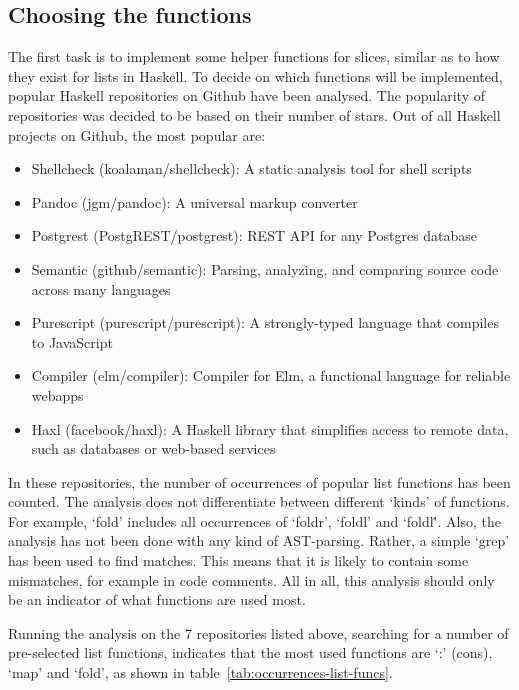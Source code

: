 \subsection{Choosing the functions}

The first task is to implement some helper functions for slices, similar as to how they exist
for lists in Haskell. To decide on which functions will be implemented, popular
Haskell repositories on Github have been analysed. The popularity of repositories
was decided to be based on their number of stars. Out of all Haskell projects
on Github, the most popular are\autocite{github-popular-haskell}:

\begin{itemize}
    \item Shellcheck (koalaman/shellcheck\autocite{github-shellcheck}): A static analysis tool for shell scripts
    \item Pandoc (jgm/pandoc\autocite{github-pandoc}): A universal markup converter
    \item Postgrest (PostgREST/postgrest\autocite{github-postgrest}): REST API for any Postgres database
    \item Semantic (github/semantic\autocite{github-semantic}): Parsing, analyzing, and comparing source code across many languages
    \item Purescript (purescript/purescript\autocite{github-purescript}): A strongly-typed language that compiles to JavaScript
    \item Compiler (elm/compiler\autocite{github-elmcompiler}): Compiler for Elm, a functional language for reliable webapps
    \item Haxl (facebook/haxl\autocite{github-haxl}): A Haskell library that simplifies access to remote data, such as databases or web-based services
\end{itemize}

In these repositories, the number of occurrences of popular list functions has
been counted. The analysis does not differentiate between different `kinds' of
functions. For example, `fold' includes all occurrences of `foldr', `foldl' and
`foldl\''. Also, the analysis has not been done with any kind of AST-parsing.
Rather, a simple `grep' has been used to find matches. This means that it is
likely to contain some mismatches, for example in code comments. All in all,
this analysis should only be an indicator of what functions are used most.

Running the analysis on the 7 repositories listed above, searching for a number
of pre-selected list functions, indicates that the most used functions are `:'
(cons), `map' and `fold', as shown in table~\ref{tab:occurrences-list-funcs}.

